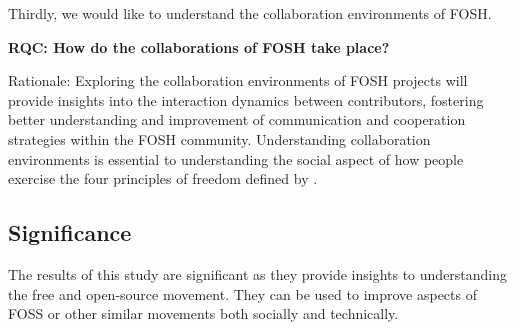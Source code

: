 \documentclass[final-report.tex]{subfiles}
\begin{document}
    \label{RQB}

Thirdly, we would like to understand the collaboration environments of FOSH.

    \textbf{RQC: How do the collaborations of FOSH take place?}
    
Rationale: Exploring the collaboration environments of FOSH projects will provide insights into the interaction dynamics between contributors, fostering better understanding and improvement of communication and cooperation strategies within the FOSH community.
Understanding collaboration environments is essential to understanding the social aspect of how people exercise the four principles of freedom defined by \cite{b0_stallman}.

    \label{RQC}
\subsection{Significance}
The results of this study are significant as they provide insights to understanding the free and open-source movement. 
They can be used to improve aspects of FOSS or other similar movements both socially and technically. 


\end{document}
